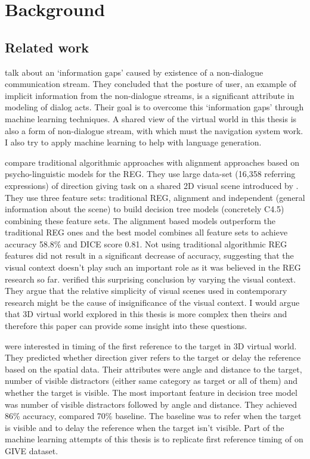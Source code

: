 \chapter{Background}
\label{chap:bg}
\section{Related work}

\citet{ha2012combining} talk about an `information gaps' caused by existence of a non-dialogue communication stream. They concluded that the posture of user, an example of implicit information from the non-dialogue streams, is a significant attribute in modeling of dialog acts. Their goal is to overcome this `information gaps' through machine learning techniques. A shared view of the virtual world in this thesis is also a form of non-dialogue stream, with which must the navigation system work. I also try to apply machine learning to help with language generation.

\citet{viethen2011generating} compare traditional algorithmic approaches with alignment approaches based on psycho-linguistic models for the REG. They use large data-set (16,358 referring expressions) of direction giving task on a shared 2D visual scene introduced by \citet{louwerse2007multimodal}. They use three feature sets: traditional REG, alignment and independent (general information about the scene) to build decision tree models (concretely C4.5) combining these feature sets. The alignment based models outperform the traditional REG ones and the best model combines all feature sets to achieve accuracy 58.8\% and DICE score 0.81. Not using traditional algorithmic REG features did not result in a significant decrease of accuracy, suggesting that the visual context doesn't play such an important role as it was believed in the REG research so far.  \citet{viethen2011impact} verified this surprising conclusion by varying the visual context. They argue that the relative simplicity of visual scenes used in contemporary research might be the cause of insignificance of the visual context. I would argue that 3D  virtual world explored in this thesis is more complex then theirs and therefore this paper can provide some insight into these questions.  

\citet{stoia2006sentence} were interested in timing of the first reference to the target in 3D virtual world. They predicted whether direction giver refers to the target or delay the reference based on the spatial data. Their attributes were angle and distance to the target, number of visible distractors (either same category as target or all of them) and whether the target is visible. The most important feature in decision tree model was number of visible distractors followed by angle and distance. They achieved 86\% accuracy, compared 70\% baseline. The baseline was to refer when the target is visible and to delay the reference when the target isn't visible. Part of the machine learning attempts of this thesis is to replicate first reference timing of \citet{stoia2006sentence} on GIVE dataset.

